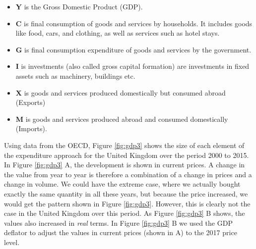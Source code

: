 \documentclass[]{book}
\providecommand{\tightlist}{%
  \setlength{\itemsep}{0pt}\setlength{\parskip}{0pt}}
\begin{document}
\begin{itemize}
\tightlist
\item
  \textbf{Y} is the Gross Domestic Product (GDP).
\item
  \textbf{C} is final consumption of goods and services by households. It includes goods like food, cars, and clothing, as well as services such as hotel stays.
\item
  \textbf{G} is final consumption expenditure of goods and services by the government.
\item
  \textbf{I} is investments (also called gross capital formation) are investments in fixed assets such as machinery, buildings etc.
\item
  \textbf{X} is goods and services produced domestically but consumed abroad (Exports)
\item
  \textbf{M} is goods and services produced abroad and consumed domestically (Imports).
\end{itemize}

Using data from the OECD, Figure \ref{fig:gdp3} shows the size of each element of the expenditure approach for the United Kingdom over the period 2000 to 2015. In Figure \ref{fig:gdp3} A, the development is shown in current prices. A change in the value from year to year is therefore a combination of a change in prices and a change in volume. We could have the extreme case, where we actually bought exactly the same quantity in all these years, but because the price increased, we would get the pattern shown in Figure \ref{fig:gdp3}. However, this is clearly not the case in the United Kingdom over this period. As Figure \ref{fig:gdp3} B shows, the values also increased in \emph{real} terms. In Figure \ref{fig:gdp3} B we used the GDP deflator to adjust the values in current prices (shown in A) to the 2017 price level.
\end{document}
